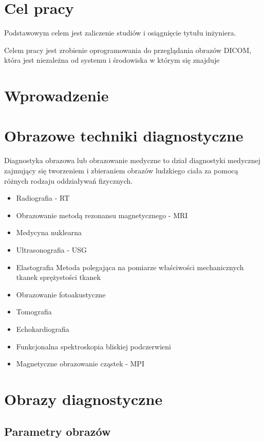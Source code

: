 
\section{Cel pracy}

Podstawowym celem jest zaliczenie studiów i osiągnięcie tytułu inżyniera.

Celem pracy jest zrobienie oprogramowania do przeglądania obrazów DICOM, która jest niezależna od systemu i środowiska w którym się znajduje

\section{Wprowadzenie}

\section{Obrazowe techniki diagnostyczne}

Diagnostyka obrazowa lub obrazowanie medyczne to dział diagnostyki medycznej zajmujący się tworzeniem i zbieraniem obrazów ludzkiego ciała za pomocą różnych rodzaju oddziaływań fizycznych.

\begin{itemize}
    \item Radiografia - RT
    \item Obrazowanie metodą rezonansu magnetycznego - MRI
    \item Medycyna nuklearna
    \item Ultrasonografia - USG

    \item Elastografia
    Metoda polegająca na pomiarze właściwości mechanicznych tkanek sprężystości tkanek

    \item Obrazowanie fotoakustyczne
    \item Tomografia
    \item Echokardiografia
    \item Funkcjonalna spektroskopia bliskiej podczerwieni
    \item Magnetyczne obrazowanie cząstek - MPI
\end{itemize}

\section{Obrazy diagnostyczne}

\subsection{Parametry obrazów}

